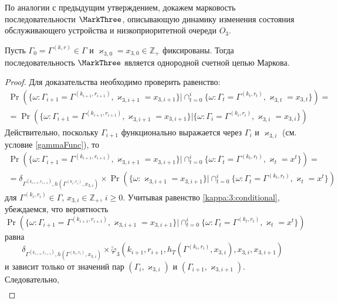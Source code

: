 По аналогии с предыдущим утверждением,  докажем марковость последовательности $\MarkThree$,  описывающую динамику изменения состояния обслуживающего устройства и низкоприоритетной очереди $O_3$.
\begin{theorem}
Пусть $\Gamma_0=\Gamma^{(k, r)}\in \Gamma$ и $\varkappa_{3, 0}=x_{3, 0}\in \mathbb{Z}_+$ фиксированы. Тогда последовательность $\MarkThree$ является однородной счетной цепью Маркова.
\label{markov:theorem:three}
\end{theorem}
\begin{proof}
Для доказательства необходимо проверить равенство:
\begin{multline}
\Pr (\{ \omega\colon \Gamma_{i+1} =\Gamma^{(k_{i+1},  r_{i+1})}, \varkappa_{3,  i+1} = x_{3,  i+1}\} |\cap_{t=0}^{i}\{\omega\colon  \Gamma_t=\Gamma^{(k_t, r_t)},  \varkappa_{3, t}=x_{3, t}\}) = \\
= \Pr (\{ \omega\colon \Gamma_{i+1} =\Gamma^{(k_{i+1}, r_{i+1})}, \varkappa_{3, i+1} = x_{3, i+1}\} |\{\omega\colon  \Gamma_i=\Gamma^{(k_i, r_i)},  \varkappa_{3, i}=x_{3, i}\})
    \label{marktoprove:third}
\end{multline}
Действительно,  поскольку $\Gamma_{i+1}$ функционально выражается через $\Gamma_i$ и $\varkappa_{3, i}$ (см. условие \eqref{gammaFunc}),  то
\begin{multline*}
\Pr (\{ \omega\colon \Gamma_{i+1} =\Gamma^{(k_{i+1}, r_{i+1})}, \varkappa_{3, i+1} = x_{3, i+1}\} |\cap_{t=0}^{i}\{\omega\colon  \Gamma_t=\Gamma^{(k_t, r_t)},  \varkappa_t=x^t\})=\\
=\delta_{\Gamma^{(k_{i+1}, r_{i+1})}, h(\Gamma^{(k_i, r_i)}, x_{3, i})}\times \Pr (\{ \omega\colon  \varkappa_{3, i+1} = x_{3, i+1}\} |\cap_{t=0}^{i}\{\omega\colon  \Gamma_t=\Gamma^{(k_t, r_t)},  \varkappa_t=x^t\})
\end{multline*}
для $\Gamma^{(k_i, r_i)}\in \Gamma$,  $x_{3, i}\in {\mathbb Z}_+$,  $i\geqslant 0$. Учитывая равенство \eqref{kappa:3:conditional},  убеждаемся,  что вероятность 
$$
\Pr (\{\omega\colon  \Gamma_{i+1} =\Gamma^{(k_{i+1},  r_{i+1})},  \varkappa_{3,  i+1} = x_{3,  i+1}\} |\cap_{t=0}^{i}\{\omega\colon \Gamma_t=\Gamma^{(k_t,  r_t)},   \varkappa_t=x^t\}) 
$$ 
равна
$$
\delta_{\Gamma^{(k_{i+1},  r_{i+1})},  h(\Gamma^{(k_i,  r_i)},  x_{3,  i})} \times \widetilde{\varphi}_3(k_{i+1},  r_{i+1},  h_T(\Gamma^{(k_i,  r_i)},  x_{3,  i}),  x_{3,  i},  x_{3,  i+1})
$$
и зависит только от значений пар $(\Gamma_i,  \varkappa_{3,  i})$ и $(\Gamma_{i+1},  \varkappa_{3,  i+1})$. Следовательно,   
\begin{multline*}

\end{multline*}
\end{proof}

